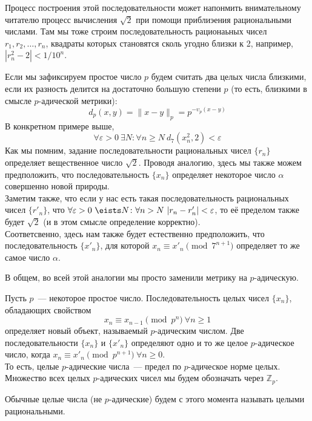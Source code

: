 \documentclass[11pt]{article}
\begin{document}
    Процесс построения этой последовательности может напонмить внимательному читателю процесс вычисления $\sqrt{2}$
    при помощи приблиэения рациональными числами. Там мы тоже строим последовательность рационаьных чисел
    $r_1, r_2, \ldots, r_n$, квадраты которых становятся сколь угодно близки к 2, например, $|r_n^2 - 2|< 1/10^n$.

    Если мы зафиксируем простое число $p$ будем считать два целых числа близкими, если их разность делится на достаточно большую
    степени $p$ (то есть, близкими в смысле $p$-адической метрики):
    \[ d_p(x, y) = \| x - y \|_p = p^{-\upsilon_p(x - y)}\]
    В конкретном примере выше,
    \[ \forall \varepsilon > 0 \ \exists N\colon \forall n \ge N \  d_7(x_n^2, 2) < \varepsilon \]
    Как мы помним, задание последовательности рациональных чисел $\{ r_n \}$ определяет вещественное число $\sqrt{2}$.
    Проводя аналогию, здесь мы также можем предположить, что последовательность $\{ x_n \}$ определяет некоторое
    число $\alpha$ совершенно новой природы. \\
    Заметим также, что если у нас есть такая последовательность рациональных чисел $\{ r'_n \}$, что $\forall \varepsilon > 0 \ \eists N\colon \forall n > N \ |r_n - r'_n| < \varepsilon $, то
    её пределом также будет $\sqrt{2}$ (и в этом смысле определение корректно).\\
    Соответсвенно, здесь нам также будет естественно предположить, что последовательность $\{ x'_n \}$, для которой $x_n \equiv x'_n \pmod{7^{n + 1}}$  определяет то же самое число $\alpha$.
    \begin{remark}
        В общем, во всей этой аналогии мы просто заменили метрику на $p$-адическую.
    \end{remark}
    \begin{definition}
        Пусть $p$~--- некоторое простое число. Последовательность целых чисел $\{ x_n \}$, обладающих свойством
        \[ x_n \equiv x_{n - 1} \pmod{p^n} \ \forall n \ge 1\]
        определяет новый объект, называемый $p$-адическим числом. Две последовательности $\{ x_n \}$ и $\{ x'_n \}$ определяют одно и то же
        целое $p$-адическое число, когда $x_n \equiv x'_n \pmod{p^{n + 1}} \ \forall n \ge 0$.\\
        То есть, целые $p$-адические числа~--- предел по $p$-адическое норме целых.\\
        Множество всех целых $p$-адических чисел мы будем обозначать через $\mathbb{Z}_p$.\\
    \end{definition}
    Обычные целые числа (не $p$-адические) будем с этого момента называть целыми рациональными.\\
\end{document}
